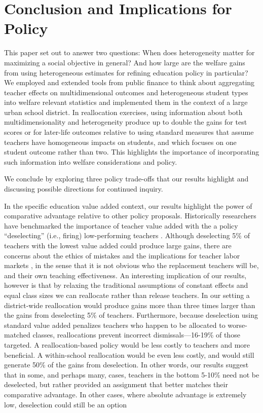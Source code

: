 \documentclass[12pt]{article}
\theoremstyle{definition}
\theoremstyle{definition}
\theoremstyle{definition}
\theoremstyle{definition}
\begin{document}
\section{Conclusion and Implications for Policy}
This paper set out to answer two questions: When does heterogeneity matter for maximizing a social objective in general? And how large are the welfare gains from using heterogeneous estimates for refining education policy in particular? We employed and extended tools from public finance to think about aggregating teacher effects on multidimensional outcomes and heterogeneous student types into welfare relevant statistics and implemented them in the context of a large urban school district. In reallocation exercises, using information about both multidimensionality and heterogeneity produce up to double the gains for test scores or for later-life outcomes relative to using standard measures that assume teachers have homogeneous impacts on students, and which focuses on one student outcome rather than two. This highlights the importance of incorporating such information into welfare considerations and policy.

We conclude by exploring three policy trade-offs that our results highlight and discussing possible directions for continued inquiry.


In the specific education value added context, our results highlight the power of comparative advantage relative to other policy proposals. Historically researchers have benchmarked the importance of teacher value added with the a policy ``deselecting'' (i.e., firing) low-performing teachers \citep[see][]{hanushek2009teacher,hanushek2011economic,chetty2014measuring2,Delgado2020}. Although deselecting 5\% of teachers with the lowest value added could produce large gains, there are concerns about the ethics of mistakes \citep{staiger2010searching} and the implications for teacher labor markets \citep{rothstein2015teacher}, in the sense that it is not obvious who the replacement teachers will be, and their own teaching effectiveness. An interesting implication of our results, however is that by relaxing the traditional assumptions of constant effects and equal class sizes we can reallocate rather than release teachers. In our setting a district-wide reallocation would produce gains more than three times larger than the gains from deselecting 5\% of teachers. Furthermore, because deselection using standard value added penalizes teachers who happen to be allocated to worse-matched classes, reallocations prevent incorrect dismissals---16-19\% of those targeted. A reallocation-based policy would be less costly to teachers and more beneficial. A within-school reallocation would be even less costly, and would still generate 50\% of the gains from deselection. In other words, our results suggest that in some, and perhaps many, cases, teachers in the bottom 5-10\% need not be deselected, but rather provided an assignment that better matches their comparative advantage. In other cases, where absolute advantage is extremely low, deselection could still be an option
\end{document}
